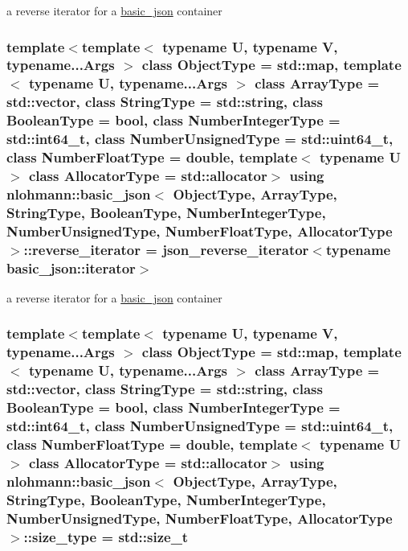a reverse iterator for a \hyperlink{classnlohmann_1_1basic__json}{basic\-\_\-json} container 

\hypertarget{classnlohmann_1_1basic__json_a2f1f83aa187a56dc5ec7a7027065ac8a}{
\subsubsection[{reverse\-\_\-iterator}]{\setlength{\rightskip}{0pt plus 5cm}template$<$template$<$ typename U, typename V, typename...\-Args $>$ class Object\-Type = std\-::map, template$<$ typename U, typename...\-Args $>$ class Array\-Type = std\-::vector, class String\-Type  = std\-::string, class Boolean\-Type  = bool, class Number\-Integer\-Type  = std\-::int64\-\_\-t, class Number\-Unsigned\-Type  = std\-::uint64\-\_\-t, class Number\-Float\-Type  = double, template$<$ typename U $>$ class Allocator\-Type = std\-::allocator$>$ using {\bf nlohmann\-::basic\-\_\-json}$<$ Object\-Type, Array\-Type, String\-Type, Boolean\-Type, Number\-Integer\-Type, Number\-Unsigned\-Type, Number\-Float\-Type, Allocator\-Type $>$\-::{\bf reverse\-\_\-iterator} =  {\bf json\-\_\-reverse\-\_\-iterator}$<$typename {\bf basic\-\_\-json\-::iterator}$>$}}\label{classnlohmann_1_1basic__json_a2f1f83aa187a56dc5ec7a7027065ac8a}


a reverse iterator for a \hyperlink{classnlohmann_1_1basic__json}{basic\-\_\-json} container 

\hypertarget{classnlohmann_1_1basic__json_a1579a8f72a230358d6cd1a6e8a62859b}{
\subsubsection[{size\-\_\-type}]{\setlength{\rightskip}{0pt plus 5cm}template$<$template$<$ typename U, typename V, typename...\-Args $>$ class Object\-Type = std\-::map, template$<$ typename U, typename...\-Args $>$ class Array\-Type = std\-::vector, class String\-Type  = std\-::string, class Boolean\-Type  = bool, class Number\-Integer\-Type  = std\-::int64\-\_\-t, class Number\-Unsigned\-Type  = std\-::uint64\-\_\-t, class Number\-Float\-Type  = double, template$<$ typename U $>$ class Allocator\-Type = std\-::allocator$>$ using {\bf nlohmann\-::basic\-\_\-json}$<$ Object\-Type, Array\-Type, String\-Type, Boolean\-Type, Number\-Integer\-Type, Number\-Unsigned\-Type, Number\-Float\-Type, Allocator\-Type $>$\-::{\bf size\-\_\-type} =  std\-::size\-\_\-t}}\label{classnlohmann_1_1basic__json_a1579a8f72a230358d6cd1a6e8a62859b}


